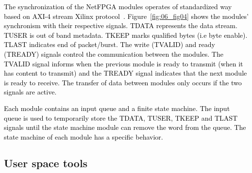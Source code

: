 \textcolor{black}{The synchronization of the NetFPGA modules operates of standardized way based on AXI-4 stream Xilinx protocol~\cite{XilinxAXI4}. Figure~\ref{fig:06_fig04} shows the 
modules' synchronism with their respective signals. TDATA represents the data stream. TUSER is out of band metadata. TKEEP marks qualified bytes (i.e byte enable). TLAST indicates end of packet/burst. The write (TVALID) and ready (TREADY) signals control the communication between the modules. The TVALID signal informs when the previous module is ready to transmit (when it has content to transmit) and the TREADY signal indicates that the next module is ready to receive. The transfer of data between modules only occurs if the two signals are active.} 

\textcolor{black}{Each module contains an input queue and a finite state machine. The input queue is used to temporarily store the TDATA, TUSER, TKEEP  and TLAST signals until the state machine module can remove the word from the queue. The state machine of each module has a specific behavior.}

\subsection{User space tools}


